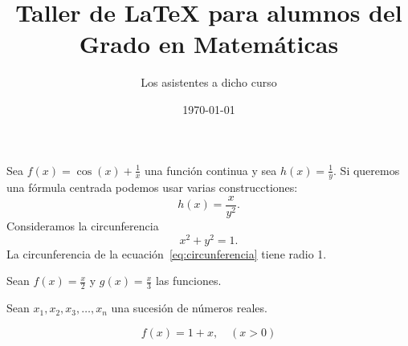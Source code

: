 \documentclass{article}
\title{Taller de \LaTeX{} para alumnos del Grado en Matemáticas}
\author{Los asistentes a dicho curso}
\date{\today}
\begin{document}
\maketitle

\tableofcontents
\bigskip

Sea $f(x)=\cos(x)+\frac{1}{x}$ una función continua y sea $h(x) = \frac{1}{y}$. Si queremos una fórmula centrada podemos usar varias construcctiones:
\[
    h(x) = \frac{x}{y^2} .
\]
Consideramos la circunferencia
\begin{equation} \label{eq:circunferencia}
    x^2 + y^2 = 1 .
\end{equation}
La circunferencia de la ecuación~\eqref{eq:circunferencia} tiene radio 1.

Sean $f(x)=\frac{x}{2}$ y $\displaystyle
g(x)=\frac{x}{3}$ las funciones.

Sean $x_{1},x_{2},x_{3},\dots, x_{n}$ una sucesión de números reales.

\[
f(x) = 1+x, \quad (x>0)
\]
\end{document}
